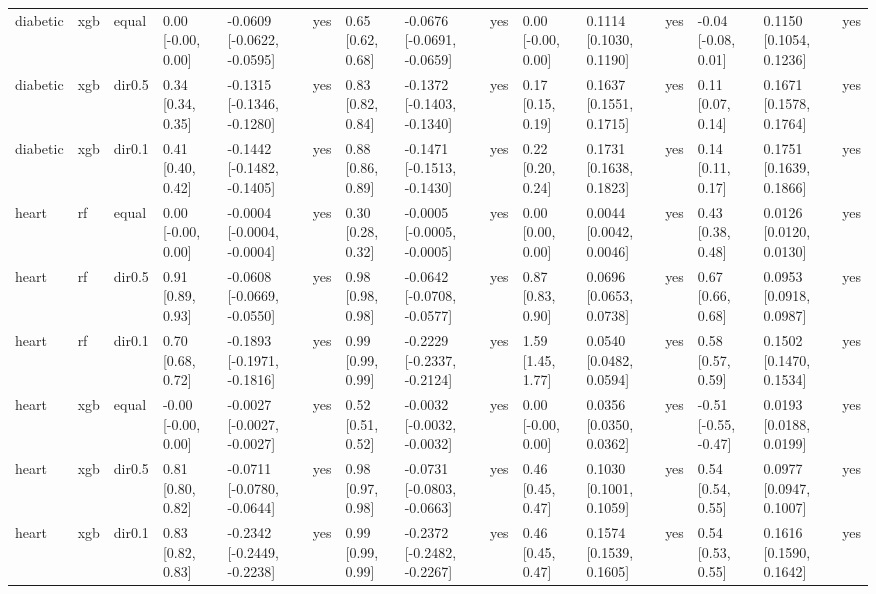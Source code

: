\begin{tabular}{lllllllllllllll}
diabetic & xgb & equal & 0.00 [-0.00, 0.00] & -0.0609 [-0.0622, -0.0595] & yes & 0.65 [0.62, 0.68] & -0.0676 [-0.0691, -0.0659] & yes & 0.00 [-0.00, 0.00] & 0.1114 [0.1030, 0.1190] & yes & -0.04 [-0.08, 0.01] & 0.1150 [0.1054, 0.1236] & yes \\
diabetic & xgb & dir0.5 & 0.34 [0.34, 0.35] & -0.1315 [-0.1346, -0.1280] & yes & 0.83 [0.82, 0.84] & -0.1372 [-0.1403, -0.1340] & yes & 0.17 [0.15, 0.19] & 0.1637 [0.1551, 0.1715] & yes & 0.11 [0.07, 0.14] & 0.1671 [0.1578, 0.1764] & yes \\
diabetic & xgb & dir0.1 & 0.41 [0.40, 0.42] & -0.1442 [-0.1482, -0.1405] & yes & 0.88 [0.86, 0.89] & -0.1471 [-0.1513, -0.1430] & yes & 0.22 [0.20, 0.24] & 0.1731 [0.1638, 0.1823] & yes & 0.14 [0.11, 0.17] & 0.1751 [0.1639, 0.1866] & yes \\
\addlinespace
heart & rf & equal & 0.00 [-0.00, 0.00] & -0.0004 [-0.0004, -0.0004] & yes & 0.30 [0.28, 0.32] & -0.0005 [-0.0005, -0.0005] & yes & 0.00 [0.00, 0.00] & 0.0044 [0.0042, 0.0046] & yes & 0.43 [0.38, 0.48] & 0.0126 [0.0120, 0.0130] & yes \\
heart & rf & dir0.5 & 0.91 [0.89, 0.93] & -0.0608 [-0.0669, -0.0550] & yes & 0.98 [0.98, 0.98] & -0.0642 [-0.0708, -0.0577] & yes & 0.87 [0.83, 0.90] & 0.0696 [0.0653, 0.0738] & yes & 0.67 [0.66, 0.68] & 0.0953 [0.0918, 0.0987] & yes \\
heart & rf & dir0.1 & 0.70 [0.68, 0.72] & -0.1893 [-0.1971, -0.1816] & yes & 0.99 [0.99, 0.99] & -0.2229 [-0.2337, -0.2124] & yes & 1.59 [1.45, 1.77] & 0.0540 [0.0482, 0.0594] & yes & 0.58 [0.57, 0.59] & 0.1502 [0.1470, 0.1534] & yes \\
heart & xgb & equal & -0.00 [-0.00, 0.00] & -0.0027 [-0.0027, -0.0027] & yes & 0.52 [0.51, 0.52] & -0.0032 [-0.0032, -0.0032] & yes & 0.00 [-0.00, 0.00] & 0.0356 [0.0350, 0.0362] & yes & -0.51 [-0.55, -0.47] & 0.0193 [0.0188, 0.0199] & yes \\
heart & xgb & dir0.5 & 0.81 [0.80, 0.82] & -0.0711 [-0.0780, -0.0644] & yes & 0.98 [0.97, 0.98] & -0.0731 [-0.0803, -0.0663] & yes & 0.46 [0.45, 0.47] & 0.1030 [0.1001, 0.1059] & yes & 0.54 [0.54, 0.55] & 0.0977 [0.0947, 0.1007] & yes \\
heart & xgb & dir0.1 & 0.83 [0.82, 0.83] & -0.2342 [-0.2449, -0.2238] & yes & 0.99 [0.99, 0.99] & -0.2372 [-0.2482, -0.2267] & yes & 0.46 [0.45, 0.47] & 0.1574 [0.1539, 0.1605] & yes & 0.54 [0.53, 0.55] & 0.1616 [0.1590, 0.1642] & yes \\
\bottomrule
\end{tabular}
